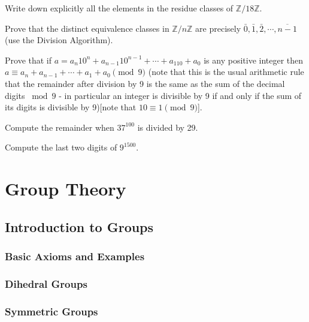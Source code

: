 \documentclass[cn,11pt,chinese]{elegantbook}
\numberwithin{equation}{section}
\begin{document}
\begin{problemset}
\item Write down explicitly all the elements in the residue classes of $\mathbb{Z}/18\mathbb{Z}$.

\item Prove that the distinct equivalence classes in $\mathbb{Z}/n\mathbb{Z}$ are precisely $\bar{0}, \bar{1}, \bar{2}, \cdots, \overline{n-1}$(use the Division Algorithm).

\item Prove that if $a= a_n10^n + a_{n-1}10^{n-1} + \cdots + a_110 + a_0$ is any positive integer then $a \equiv a_n + a_{n-1} + \cdots +a_1+a_0 \pmod{9}$ (note that this is the usual arithmetic rule that the remainder after division by 9 is the same as the sum of the decimal digits $\bmod{9}$ - in particular an integer is divisible by 9 if and only if the sum of its digits is divisible by 9)[note that $10 \equiv 1\pmod{9}$].

\item Compute the remainder when $37^{100}$ is divided by 29.

\item Compute the last two digits of $9^{1500}$.


\end{problemset}

\part{Group Theory}
\chapter{Introduction to Groups}\label{chapter001}
\section{Basic Axioms and Examples}\label{section00101}


\section{Dihedral Groups}\label{section00102}



\section{Symmetric Groups}\label{section00103}
\end{document}
